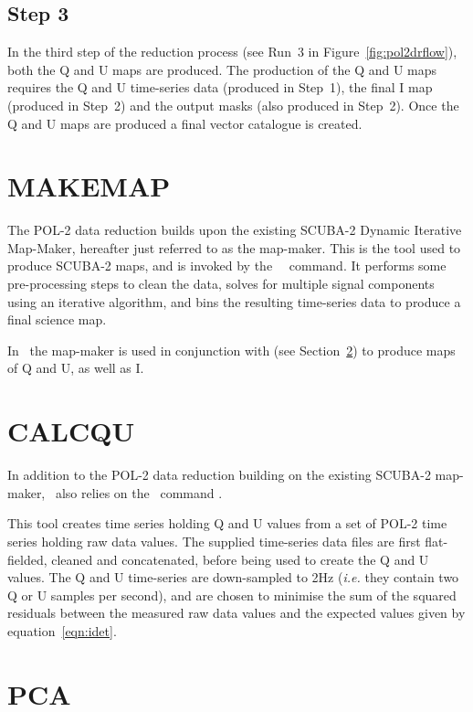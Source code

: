 \subsection*{Step 3}

In the third step of the reduction process (see Run~3 in
Figure~\ref{fig:pol2drflow}), both the Q and U maps are produced. The production
of the Q and U maps requires the Q and U time-series data (produced in
Step~1), the final I map (produced in Step~2) and the output masks (also
produced in Step~2). Once the Q and U maps are produced a final vector
catalogue is created.

\section{MAKEMAP}

The POL-2 data reduction builds upon the existing SCUBA-2 Dynamic
Iterative Map-Maker, hereafter just referred to as the map-maker. This
is the tool used to produce SCUBA-2 maps, and is invoked by the
\SMURF\ \makemap\ command. It performs some
pre-processing steps to clean the data, solves for multiple signal
components using an iterative algorithm, and bins the resulting
time-series data to produce a final science map.

In \poltwomap\ the map-maker is used in conjunction with
 (see
Section~\ref{sec:calcqu}) to produce maps of Q and U, as well as I.

\section{CALCQU}
\label{sec:calcqu}

In addition to the POL-2 data reduction building on the
existing SCUBA-2 map-maker, \poltwomap\ also relies on the \SMURF\
command .

This  tool creates time series holding Q and U values from a set of POL-2
time series holding raw data values. The supplied time-series data files are first
flat-fielded, cleaned and concatenated, before being used to create
the Q and U values. The Q and U time-series are down-sampled to 2Hz
(\emph{i.e.} they contain two Q or U samples per second), and are 
chosen to minimise the sum of the squared residuals between the measured 
raw data values and the expected values given by equation~\ref{eqn:idet}.


\section{PCA}
\label{sec:pca}

